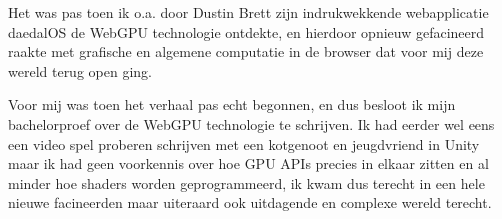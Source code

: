 \bigbreak{}

Het was pas toen ik o.a. door Dustin Brett zijn indrukwekkende webapplicatie daedalOS de WebGPU technologie ontdekte, en hierdoor opnieuw gefacineerd raakte met grafische en algemene computatie in de browser dat voor mij deze wereld terug open ging.

\bigbreak{}

Voor mij was toen het verhaal pas echt begonnen, en dus besloot ik mijn bachelorproef over de WebGPU technologie te schrijven. Ik had eerder wel eens een video spel proberen schrijven met een kotgenoot en jeugdvriend in Unity maar ik had geen voorkennis over hoe GPU APIs precies in elkaar zitten en al minder hoe shaders worden geprogrammeerd, ik kwam dus terecht in een hele
nieuwe facineerden maar uiteraard ook uitdagende en complexe wereld terecht.